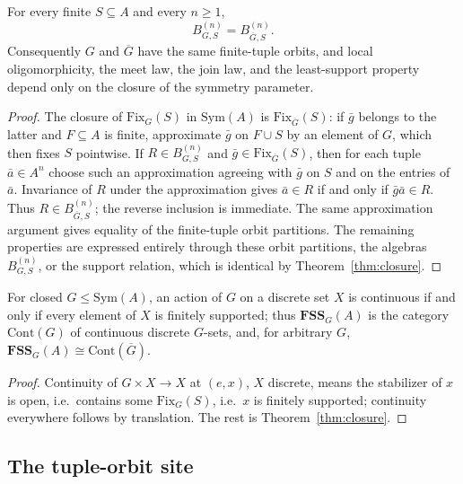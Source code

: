 \documentclass{lmcs}
\newcommand{\Sym}{\mathrm{Sym}}
\newcommand{\Fix}{\mathrm{Fix}}
\newcommand{\FSS}{\mathbf{FSS}}
\begin{document}
\begin{cor}
\label{cor:closure-hierarchy}
For every finite $S\subseteq A$ and every $n\geq1$,
\[
   B^{(n)}_{G,S}=B^{(n)}_{\overline G,S}.
\]
Consequently $G$ and $\overline G$ have the same finite-tuple orbits,
and local oligomorphicity, the meet law, the join law, and the
least-support property depend only on the closure of the symmetry
parameter.
\end{cor}
\begin{proof}
The closure of $\Fix_G(S)$ in $\Sym(A)$ is
$\Fix_{\overline G}(S)$: if $\bar g$ belongs to the latter and
$F\subseteq A$ is finite, approximate $\bar g$ on $F\cup S$ by an
element of $G$, which then fixes $S$ pointwise. If
$R\in B^{(n)}_{G,S}$ and $\bar g\in\Fix_{\overline G}(S)$, then
for each tuple $\bar a\in A^n$ choose such an approximation agreeing
with $\bar g$ on $S$ and on the entries of $\bar a$. Invariance of
$R$ under the approximation gives
$\bar a\in R$ if and only if $\bar g\bar a\in R$. Thus
$R\in B^{(n)}_{\overline G,S}$; the reverse inclusion is immediate.
The same approximation argument gives equality of the finite-tuple
orbit partitions. The remaining properties are expressed entirely
through these orbit partitions, the algebras $B^{(n)}_{G,S}$, or the
support relation, which is identical by Theorem~\ref{thm:closure}.
\end{proof}

\begin{cor}\label{cor:cont}
For closed $G\leq\Sym(A)$, an action of $G$ on a discrete set $X$ is
continuous if and only if every element of $X$ is finitely supported;
thus $\FSS_G(A)$ is the category $\mathrm{Cont}(G)$ of continuous
discrete $G$-sets, and, for arbitrary $G$,
$\FSS_G(A)\cong\mathrm{Cont}(\overline G)$.
\end{cor}
\begin{proof}
Continuity of $G\times X\to X$ at $(e,x)$, $X$ discrete, means the
stabilizer of $x$ is open, i.e.\ contains some $\Fix_G(S)$, i.e.\ $x$
is finitely supported; continuity everywhere follows by translation.
The rest is Theorem~\ref{thm:closure}.
\end{proof}

\subsection{The tuple-orbit site}
\end{document}
